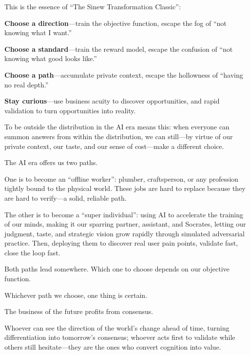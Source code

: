 \vspace{1em}

This is the essence of ``The Sinew Transformation Classic'':

\textbf{Choose a direction}---train the objective function, escape the fog of ``not knowing what I want.''

\textbf{Choose a standard}---train the reward model, escape the confusion of ``not knowing what good looks like.''

\textbf{Choose a path}---accumulate private context, escape the hollowness of ``having no real depth.''

\textbf{Stay curious}---use business acuity to discover opportunities, and rapid validation to turn opportunities into reality.

\vspace{1em}

To be outside the distribution in the AI era means this: when everyone can summon answers from within the distribution, we can still---by virtue of our private context, our taste, and our sense of cost---make a different choice.

\vspace{1em}

The AI era offers us two paths.

\vspace{1em}

One is to become an ``offline worker'': plumber, craftsperson, or any profession tightly bound to the physical world. These jobs are hard to replace because they are hard to verify---a solid, reliable path.

\vspace{1em}

The other is to become a ``super individual'': using AI to accelerate the training of our minds, making it our sparring partner, assistant, and Socrates, letting our judgment, taste, and strategic vision grow rapidly through simulated adversarial practice. Then, deploying them to discover real user pain points, validate fast, close the loop fast.

Both paths lead somewhere. Which one to choose depends on our objective function.

\vspace{1em}

Whichever path we choose, one thing is certain.

The business of the future profits from consensus.

Whoever can see the direction of the world's change ahead of time, turning differentiation into tomorrow's consensus; whoever acts first to validate while others still hesitate---they are the ones who convert cognition into value.

